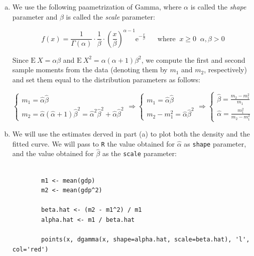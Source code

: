 \documentclass[12pt]{article}
\begin{document}
\begin{enumerate}[(a)]

\item 
We use the following paametrization of Gamma, where $\alpha$ is called the \emph{shape} parameter and $\beta$ is called  the \emph{scale} parameter:

$$
		f(x) = \frac{1}{\Gamma({\alpha})} \cdot \frac{1}{\beta} \cdot  \left( \frac{x}{\beta}\right)^{\alpha - 1} \mathrm{e}^{-\frac{x}{\beta}} \;\;\;\;\;\; \text{where} \;\;  x \ge 0 \;\; \alpha, \beta > 0
$$

Since $ \mathrm{E} \: X = \alpha\beta$ and $ \mathrm{E} \: X^2 = \alpha (\alpha + 1) \beta^2$,  we compute the first and second sample moments from the data (denoting them by $m_1$ and $m_2$, respectively) and set them equal to the distribution parameters as follows:

$$
\begin{cases} m_1   =   \hat{\alpha}\hat{\beta} \\ m_2 = \hat{\alpha} (\hat{\alpha} + 1) \hat{\beta}^2 =\hat{\alpha}^2 \hat{\beta}^2 + \hat{\alpha}\hat{\beta}^2
\end{cases}
\Rightarrow
\begin{cases}  m_1 =\hat{\alpha}\hat{\beta} \\  m_2 -  m_1^2    =  \hat{\alpha}\hat{\beta}^2 
\end{cases}
\Rightarrow
\begin{cases} \hat{\beta}  = \frac{m_2 -  m_1^2}{m_1} \\  \hat{\alpha}  = \frac{m_1^2}{m_2 - m_1^2}
\end{cases}
$$
\item
We will use the estimates derved in part (a) to plot both the density and the fitted curve. We will pass to \texttt{R} the value obtained for $\hat{\alpha}$ as \texttt{shape} parameter, and the value obtained for $\hat{\beta}$ as the \texttt{scale} parameter:


\begin{verbatim}
 
		m1 <- mean(gdp)
		m2 <- mean(gdp^2)

		beta.hat <- (m2 - m1^2) / m1
		alpha.hat <- m1 / beta.hat

		points(x, dgamma(x, shape=alpha.hat, scale=beta.hat), 'l', col='red')
\end{verbatim}




\end{enumerate}
\end{document}
